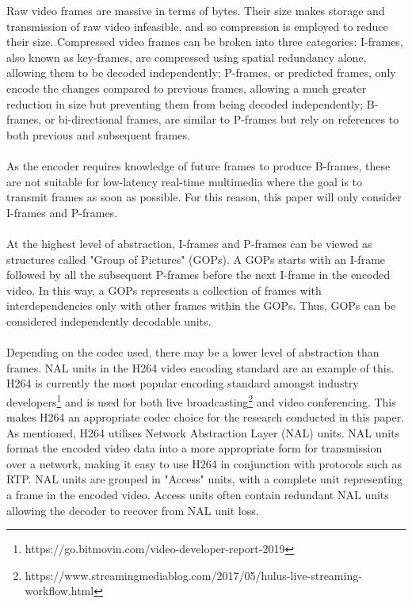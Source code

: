 \documentclass{mpaper}
\begin{document}
\noindent Raw video frames are massive in terms of bytes. Their size makes storage and transmission of raw video infeasible, and so compression is employed to reduce their size. Compressed video frames can be broken into three categories: I-frames, also known as key-frames, are compressed using spatial redundancy alone, allowing them to be decoded independently; P-frames, or predicted frames, only encode the changes compared to previous frames, allowing a much greater reduction in size but preventing them from being decoded independently; B-frames, or bi-directional frames, are similar to P-frames but rely on references to both previous and subsequent frames.
\\\\
As the encoder requires knowledge of future frames to produce B-frames, these are not suitable for low-latency real-time multimedia where the goal is to transmit frames as soon as possible. For this reason, this paper will only consider I-frames and P-frames.
\\\\
At the highest level of abstraction, I-frames and P-frames can be viewed as structures called "Group of Pictures" \newline (GOPs). A GOPs starts with an I-frame followed by all the subsequent P-frames before the next I-frame in the encoded video. In this way, a GOPs represents a collection of frames with interdependencies only with other frames within the GOPs. Thus, GOPs can be considered independently decodable units.
\\\\
Depending on the codec used, there may be a lower level of abstraction than frames. NAL units in the H264 video encoding standard are an example of this. H264 is currently the most popular encoding standard amongst industry developers\footnote{https://go.bitmovin.com/video-developer-report-2019} and is used for both live broadcasting\footnote{https://www.streamingmediablog.com/2017/05/hulus-live-streaming-workflow.html} and video conferencing. This makes H264 an appropriate codec choice for the research conducted in this paper. As mentioned, H264 utilises Network Abstraction Layer (NAL) \newline units. NAL units format the encoded video data into a more appropriate form for transmission over a network, making it easy to use H264 in conjunction with protocols such as RTP. NAL units are grouped in "Access" units, with a complete unit representing a frame in the encoded video. Access units often contain redundant NAL units allowing the decoder to recover from NAL unit loss.
\end{document}
